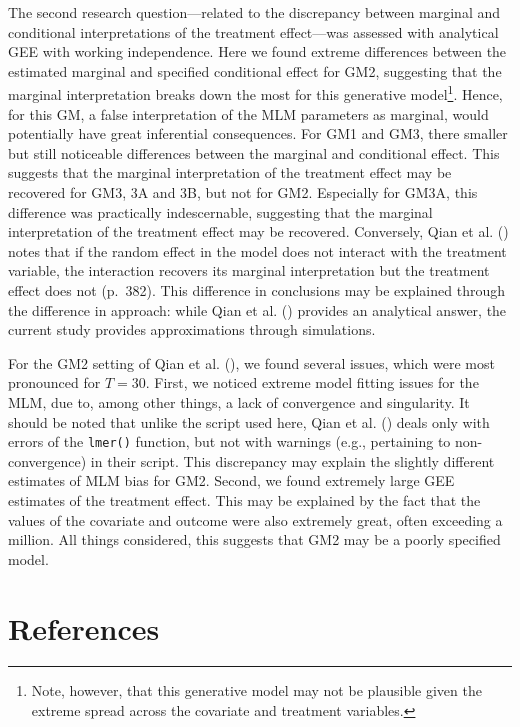 \documentclass[
  12pt,
  a4paper,
]{article}
\begin{document}
The second research question---related to the discrepancy between
marginal and conditional interpretations of the treatment effect---was
assessed with analytical GEE with working independence. Here we found
extreme differences between the estimated marginal and specified
conditional effect for GM2, suggesting that the marginal interpretation
breaks down the most for this generative model\footnote{Note, however,
  that this generative model may not be plausible given the extreme
  spread across the covariate and treatment variables.}. Hence, for this
GM, a false interpretation of the MLM parameters as marginal, would
potentially have great inferential consequences. For GM1 and GM3, there
smaller but still noticeable differences between the marginal and
conditional effect. This suggests that the marginal interpretation of
the treatment effect may be recovered for GM3, 3A and 3B, but not for
GM2. Especially for GM3A, this difference was practically indescernable,
suggesting that the marginal interpretation of the treatment effect may
be recovered. Conversely, Qian et al. ()
notes that if the random effect in the model does not interact with the
treatment variable, the interaction recovers its marginal interpretation
but the treatment effect does not (p.~382). This difference in
conclusions may be explained through the difference in approach: while
Qian et al. () provides an analytical
answer, the current study provides approximations through simulations.

For the GM2 setting of Qian et al. (), we
found several issues, which were most pronounced for \(T = 30\). First,
we noticed extreme model fitting issues for the MLM, due to, among other
things, a lack of convergence and singularity. It should be noted that
unlike the script used here, Qian et al. ()
deals only with errors of the \texttt{lmer()} function, but not with
warnings (e.g., pertaining to non-convergence) in their script. This
discrepancy may explain the slightly different estimates of MLM bias for
GM2. Second, we found extremely large GEE estimates of the treatment
effect. This may be explained by the fact that the values of the
covariate and outcome were also extremely great, often exceeding a
million. All things considered, this suggests that GM2 may be a poorly
specified model.

\newpage

\section{References}\label{references}
\end{document}

